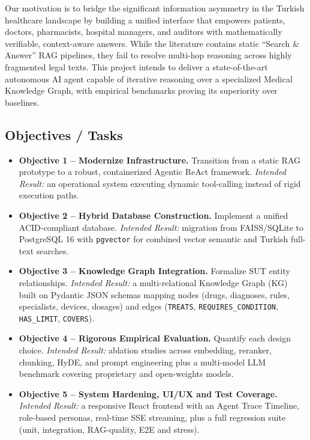 \documentclass[11pt, a4paper]{article}
\begin{document}
Our motivation is to bridge the significant information asymmetry in the Turkish healthcare landscape by building a unified interface that empowers patients, doctors, pharmacists, hospital managers, and auditors with mathematically verifiable, context-aware answers. While the literature contains static ``Search \& Answer'' RAG pipelines, they fail to resolve multi-hop reasoning across highly fragmented legal texts. This project intends to deliver a state-of-the-art autonomous AI agent capable of iterative reasoning over a specialized Medical Knowledge Graph, with empirical benchmarks proving its superiority over baselines.

\subsection{Objectives / Tasks}

\begin{itemize}[leftmargin=*]
    \item \textbf{Objective 1 -- Modernize Infrastructure.} Transition from a static RAG prototype to a robust, containerized Agentic ReAct framework. \textit{Intended Result:} an operational system executing dynamic tool-calling instead of rigid execution paths.
    \item \textbf{Objective 2 -- Hybrid Database Construction.} Implement a unified ACID-compliant database. \textit{Intended Result:} migration from FAISS/SQLite to PostgreSQL 16 with \texttt{pgvector} for combined vector semantic and Turkish full-text searches.
    \item \textbf{Objective 3 -- Knowledge Graph Integration.} Formalize SUT entity relationships. \textit{Intended Result:} a multi-relational Knowledge Graph (KG) built on Pydantic JSON schemas mapping nodes (drugs, diagnoses, rules, specialists, devices, dosages) and edges (\texttt{TREATS}, \texttt{REQUIRES\_CONDITION}, \texttt{HAS\_LIMIT}, \texttt{COVERS}).
    \item \textbf{Objective 4 -- Rigorous Empirical Evaluation.} Quantify each design choice. \textit{Intended Result:} ablation studies across embedding, reranker, chunking, HyDE, and prompt engineering plus a multi-model LLM benchmark covering proprietary and open-weights models.
    \item \textbf{Objective 5 -- System Hardening, UI/UX and Test Coverage.} \textit{Intended Result:} a responsive React frontend with an Agent Trace Timeline, role-based personas, real-time SSE streaming, plus a full regression suite (unit, integration, RAG-quality, E2E and stress).
\end{itemize}
\end{document}

